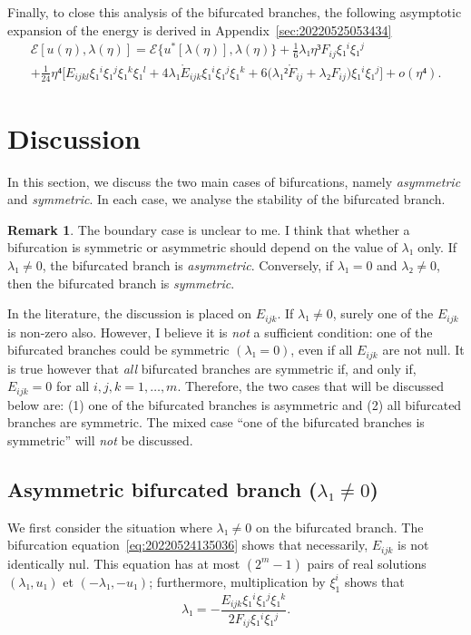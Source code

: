 \documentclass[12pt, final]{scrartcl}
\theoremstyle{definition}
\newtheorem{remark}{Remark}
\begin{document}
Finally, to close this analysis of the bifurcated branches, the following
asymptotic expansion of the energy is derived in
Appendix~\ref{sec:20220525053434}
\begin{multline}
  \label{eq:20220525053600}
    ℰ[u(η), λ(η)] = ℰ\{u^{\ast}[λ(η)], λ(η)\} + \tfrac{1}{6} λ₁ η³ F_{i j} ξ₁^i ξ₁^j\\
    +\tfrac{1}{24} η⁴ \bigl[E_{ijkl} ξ₁^i ξ₁^j ξ₁^k ξ₁^l + 4λ₁ \mathring{E}_{ijk} ξ₁^i ξ₁^j ξ₁^k + 6 \bigl(λ₁² \mathring{F}_{ij} + λ₂ F_{ij}\bigr) ξ₁^i ξ₁^j\bigr] + o(η⁴).
\end{multline}

\section{Discussion}

In this section, we discuss the two main cases of bifurcations, namely
\emph{asymmetric} and \emph{symmetric}. In each case, we analyse the stability
of the bifurcated branch.

\begin{remark}
  The boundary case is unclear to me. I think that whether a bifurcation is
  symmetric or asymmetric should depend on the value of \(λ₁\) only. If
  \(λ₁ ≠ 0\), the bifurcated branch is \emph{asymmetric}. Conversely, if
  \(λ₁ = 0\) and \(λ₂ ≠ 0\), then the bifurcated branch is \emph{symmetric}.

  In the literature, the discussion is placed on \(E_{ijk}\). If \(λ₁ ≠ 0\),
  surely one of the \(E_{ijk}\) is non-zero also. However, I believe it is
  \emph{not} a sufficient condition: one of the bifurcated branches could be
  symmetric \((λ₁ = 0)\), even if all \(E_{ijk}\) are not null. It is true
  however that \emph{all} bifurcated branches are symmetric if, and only if,
  \(E_{ijk}=0\) for all \(i, j, k = 1, \ldots, m\). Therefore, the two cases
  that will be discussed below are: (1) one of the bifurcated branches is
  asymmetric and (2) all bifurcated branches are symmetric. The mixed case ``one
  of the bifurcated branches is symmetric'' will \emph{not} be discussed.
\end{remark}

\subsection{Asymmetric bifurcated branch (\(λ₁ ≠ 0\))}

We first consider the situation where \(λ₁ ≠ 0\) on the bifurcated branch. The
bifurcation equation~\eqref{eq:20220524135036} shows that necessarily,
\(E_{ijk}\) is not identically nul. This equation has at most \((2^m - 1)\)
pairs of real solutions \((λ₁, u₁)\) et \((- λ₁, - u₁)\); furthermore,
multiplication by \(ξ_1^i\) shows that
\begin{equation}
  \label{eq:20220801085236}
  λ₁ = -\frac{E_{ijk} ξ₁^i ξ₁^j ξ₁^k}{2 F_{ij} ξ₁^i ξ₁^j}.
\end{equation}
\end{document}

